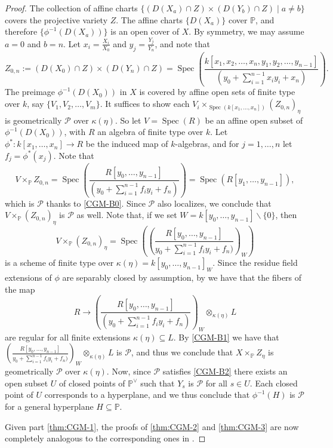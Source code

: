 \documentclass[reqno,11pt]{amsart}
\numberwithin{equation}{section}
\theoremstyle{definition}
\theoremstyle{definition}
\theoremstyle{definition}
\theoremstyle{remark}
\newcommand{\Spec}{\operatorname{Spec}}
\newcommand{\PP}{\mathbb{P}}
\newcommand{\cP}{\mathcal{P}}
\begin{document}
\begin{proof}
    The collection of affine charts $\{(D(X_a)\cap Z)\times (D(Y_b)\cap Z)\mid a\not=b\}$ covers the projective variety $Z$. The affine charts $\{D(X_a)\}$ cover $\PP$, and therefore $\{\phi^{-1}(D(X_a))\}$ is an open cover of $X$. By symmetry, we may assume $a=0$ and $b=n$. Let $x_i = \frac{X_i}{X_0}$ and $y_j= \frac{Y_j}{Y_n}$, and note that 
    \[
    Z_{0,n}:=(D(X_0)\cap Z)\times (D(Y_n)\cap Z) = \Spec\left( \frac{k[x_1,x_2,\ldots,x_n,y_1,y_2,\ldots,y_{n-1}]}{(y_0 + \sum_{i=1}^{n-1}x_iy_i + x_{n})}\right).
    \]
    The preimage $\phi^{-1}(D(X_0))$ in $X$ is covered by affine open sets of finite type over $k$, say $\{V_1,V_2,\ldots,V_m\}$. It suffices to show each $V_i\times_{\Spec(k[x_1,\ldots,x_n])} (Z_{0,n})_{\eta}$ is geometrically $\cP$  over $\kappa(\eta)$. So let $V=\Spec(R)$ be an affine open subset of $\phi^{-1}(D(X_0))$, with $R$ an algebra of finite type over $k$. Let $\phi^*:k[x_1,\ldots,x_n] \to R$ be the induced map of $k$-algebras, and for $j=1,\ldots,n$ let $f_j=\phi^*(x_j)$. Note that
    \[
    V \times_{\PP} Z_{0,n} = \Spec\left(\frac{R[y_0,\ldots,y_{n-1}]}{(y_0+\sum_{i=1}^{n-1}f_iy_i + f_n)}\right) = \Spec(R[y_1,\ldots,y_{n-1}]),
    \]
    which is $\cP$ thanks to \ref{CGM-B0}. Since $\cP$ also localizes, we conclude that $V \times_{\PP} (Z_{0,n})_\eta$ is $\cP$ as well. Note that, if we set $W=k[y_0,\ldots,y_{n-1}]\smallsetminus \{0\}$, then
    \[
    V \times_\PP (Z_{0,n})_\eta = \Spec\left(\left(\frac{R[y_0,\ldots,y_{n-1}]}{y_0+\sum_{i=1}^{n-1} f_iy_i + f_n)}\right)_W\right)
    \]
    is a scheme of finite type over $\kappa(\eta) = k[y_0,\ldots,y_{n-1}]_W$. Since the residue field extensions of $\phi$ are separably closed by assumption, by \cite{CGM86} we have that the fibers of the map 
    \[
    R \to \left(\frac{R[y_0,\ldots,y_{n-1}]}{(y_0+\sum_{i=1}^{n-1} f_iy_i + f_n)}\right)_W \otimes_{\kappa(\eta)} L
    \]
    are regular for all finite extensions $\kappa(\eta) \subseteq L$. By \ref{CGM-B1} we have that $\left(\frac{R[y_0,\ldots,y_{n-1}]}{y_0+\sum_{i=1}^{n-1} f_iy_i + f_n)}\right)_W \otimes_{\kappa(\eta)} L$ is $\cP$, and thus we conclude that $X \times_\PP Z_\eta$ is geometrically $\cP$ over $\kappa(\eta)$. 
    Now, since $\cP$ satisfies \ref{CGM-B2} there exists an open subset $U$ of closed points of $\PP^\vee$ such that $Y_s$ is $\cP$ for all $s \in U$. Each closed point of $U$ corresponds to a hyperplane, and we thus conclude that $\phi^{-1}(H)$ is $\cP$ for a general hyperplane $H \subseteq \PP$. 

    Given part \ref{thm:CGM-1}, the proofs of \ref{thm:CGM-2} and \ref{thm:CGM-3} are now completely analogous to the corresponding ones in \cite{CGM86}.
\end{proof}
\end{document}
